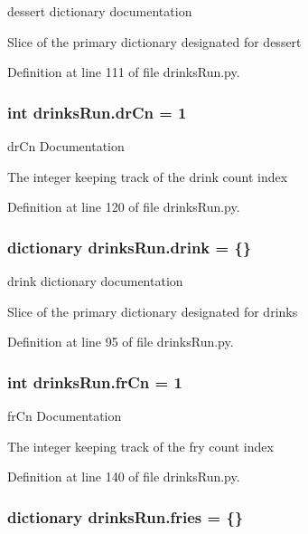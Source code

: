 dessert dictionary documentation 

Slice of the primary dictionary designated for dessert 

Definition at line 111 of file drinks\-Run.\-py.

\hypertarget{namespacedrinksRun_aad00762314fc2dd055b2fb2588fb2f44}{
\subsubsection[{dr\-Cn}]{\setlength{\rightskip}{0pt plus 5cm}int drinks\-Run.\-dr\-Cn = 1}}\label{namespacedrinksRun_aad00762314fc2dd055b2fb2588fb2f44}


dr\-Cn Documentation 

The integer keeping track of the drink count index 

Definition at line 120 of file drinks\-Run.\-py.

\hypertarget{namespacedrinksRun_a80ae8aa061b50fd5f4c631cfc0c16281}{
\subsubsection[{drink}]{\setlength{\rightskip}{0pt plus 5cm}dictionary drinks\-Run.\-drink = \{\}}}\label{namespacedrinksRun_a80ae8aa061b50fd5f4c631cfc0c16281}


drink dictionary documentation 

Slice of the primary dictionary designated for drinks 

Definition at line 95 of file drinks\-Run.\-py.

\hypertarget{namespacedrinksRun_a00dd0c364336dac1c385462acd87ca20}{
\subsubsection[{fr\-Cn}]{\setlength{\rightskip}{0pt plus 5cm}int drinks\-Run.\-fr\-Cn = 1}}\label{namespacedrinksRun_a00dd0c364336dac1c385462acd87ca20}


fr\-Cn Documentation 

The integer keeping track of the fry count index 

Definition at line 140 of file drinks\-Run.\-py.

\hypertarget{namespacedrinksRun_af1b2c5d85f80dd2df0bedc4501369889}{
\subsubsection[{fries}]{\setlength{\rightskip}{0pt plus 5cm}dictionary drinks\-Run.\-fries = \{\}}}\label{namespacedrinksRun_af1b2c5d85f80dd2df0bedc4501369889}


